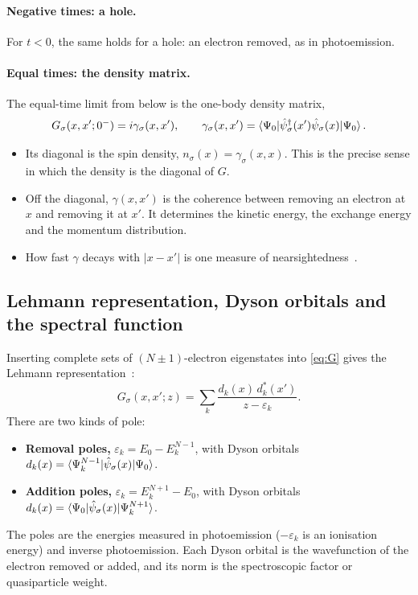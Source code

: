 \documentclass[11pt,a4paper]{article}
\begin{document}
\paragraph{Negative times: a hole.} For $t<0$, the same holds for a hole: an electron removed, as in photoemission.

\paragraph{Equal times: the density matrix.} The equal-time limit from below is the one-body density matrix,
\begin{equation}
G_\sigma(x,x';0^-) = i\gamma_\sigma(x,x'), \qquad \gamma_\sigma(x,x') = \braket{\Psi_0|\hat\psi_\sigma^\dagger(x')\hat\psi_\sigma(x)|\Psi_0}.
\label{eq:density-matrix}
\end{equation}
\begin{itemize}
\item Its diagonal is the spin density, $n_\sigma(x) = \gamma_\sigma(x,x)$. This is the precise sense in which the density is the diagonal of $G$.
\item Off the diagonal, $\gamma(x,x')$ is the coherence between removing an electron at $x$ and removing it at $x'$. It determines the kinetic energy, the exchange energy and the momentum distribution.
\item How fast $\gamma$ decays with $|x-x'|$ is one measure of nearsightedness~\cite{kohn1996,prodan2005}.
\end{itemize}

\subsection{Lehmann representation, Dyson orbitals and the spectral function}

Inserting complete sets of $(N\pm1)$-electron eigenstates into \cref{eq:G} gives the Lehmann representation~\cite{lehmann1954,fetter1971}:
\begin{equation}
G_\sigma(x,x';z) = \sum_k \frac{d_k(x)\,d_k^*(x')}{z-\varepsilon_k}.
\label{eq:lehmann}
\end{equation}
There are two kinds of pole:
\begin{itemize}
\item \textbf{Removal poles,} $\varepsilon_k = E_0 - E^{N-1}_k$, with Dyson orbitals $d_k(x) = \braket{\Psi^{N-1}_k|\hat\psi_\sigma(x)|\Psi_0}$.
\item \textbf{Addition poles,} $\varepsilon_k = E^{N+1}_k - E_0$, with Dyson orbitals $d_k(x) = \braket{\Psi_0|\hat\psi_\sigma(x)|\Psi^{N+1}_k}$.
\end{itemize}
The poles are the energies measured in photoemission ($-\varepsilon_k$ is an ionisation energy) and inverse photoemission. Each Dyson orbital is the wavefunction of the electron removed or added, and its norm is the spectroscopic factor or quasiparticle weight.
\end{document}
